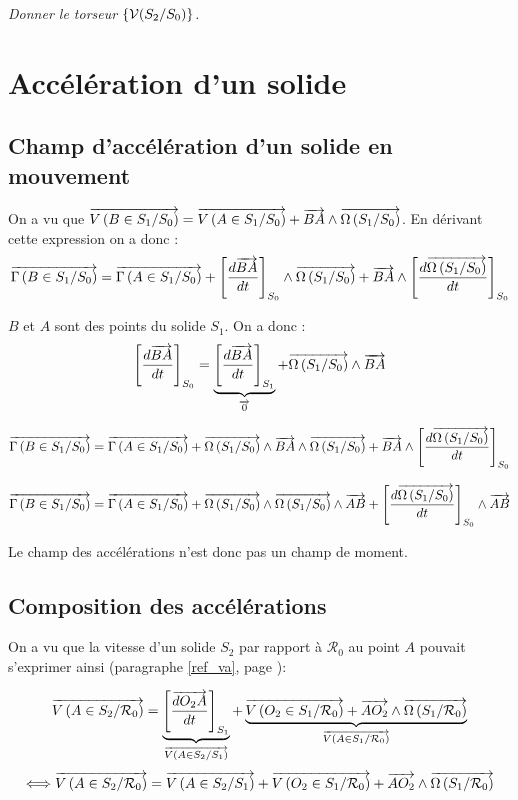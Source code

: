 \documentclass[11pt,oneside]{article}
\begin{document}
\begin{exemple}
\textit{Donner le torseur $\torseur{\mathcal{V}(S_2/S_0)}$.}
\end{exemple}

\section{Accélération d'un solide}
\subsection{Champ d'accélération d'un solide en mouvement}
On a vu que 
$\vectv{B}{S_1}{S_0} = \vectv{A}{S_1}{S_0} + \vect{BA} \wedge \vecto{S_1}{S_0}$. En dérivant cette expression on a donc : 
$$
\vectg{B}{S_1}{S_0} 
= \vectg{A}{S_1}{S_0} 
+\left[\dfrac{d\vect{BA}}{dt}\right]_{S_0} \wedge \vecto{S_1}{S_0}
+\vect{BA} \wedge \left[\dfrac{d\vecto{S_1}{S_0}}{dt}\right]_{S_0}
$$

$B$ et $A$ sont des points du solide $S_1$. On a donc : 
 $$
\left[\dfrac{d\vect{BA}}{dt}\right]_{S_0} =
\underbrace{\left[\dfrac{d\vect{BA}}{dt}\right]_{S_1}}_{\vect{0}} 
+ \vecto{S_1}{S_0} \wedge \vect{BA}
$$

$$
\vectg{B}{S_1}{S_0} 
= \vectg{A}{S_1}{S_0} 
+\vecto{S_1}{S_0} \wedge \vect{BA}
\wedge \vecto{S_1}{S_0}
+\vect{BA} \wedge \left[\dfrac{d\vecto{S_1}{S_0}}{dt}\right]_{S_0}
$$

$$
\vectg{B}{S_1}{S_0} 
= \vectg{A}{S_1}{S_0} 
+\vecto{S_1}{S_0} \wedge \vecto{S_1}{S_0}
\wedge \vect{AB}
+\left[\dfrac{d\vecto{S_1}{S_0}}{dt}\right]_{S_0} \wedge \vect{AB} 
$$

\begin{resultat}
Le champ des accélérations n'est donc pas un champ de moment.
\end{resultat}

\subsection{Composition des accélérations}
On a vu que la vitesse d'un solide $S_2$ par rapport à $\mathcal{R}_0$ au point $A$ pouvait s'exprimer ainsi (paragraphe \ref{ref_va}, page \pageref{ref_va}):

$$
\vectv{A}{S_2}{\mathcal{R}_0}
=
\underbrace{\left[\dfrac{\vect{dO_2 A}}{dt}\right]_{S_1}}_{\vectv{A}{S_2}{S_1}}
+
\underbrace{\vectv{O_2}{S_1}{\mathcal{R}_0}
+
\vect{AO_2}
\wedge 
\vecto{S_1}{\mathcal{R}_0}}_{\vectv{A}{S_1}{\mathcal{R}_0}}
$$
$$
\Longleftrightarrow
\vectv{A}{S_2}{\mathcal{R}_0}
=
\vectv{A}{S_2}{S_1} + \vectv{O_2}{S_1}{\mathcal{R}_0}
+
\vect{AO_2}
\wedge 
\vecto{S_1}{\mathcal{R}_0}
$$
\end{document}
